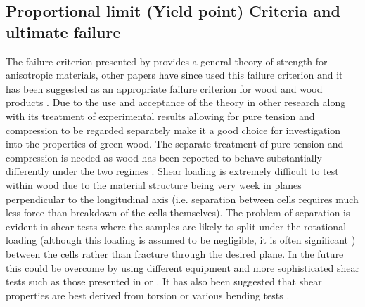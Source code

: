 \documentclass[10pt]{article}
\begin{document}
\subsection{Proportional limit (Yield point) Criteria and ultimate failure}
\label{sec:TW}
The failure criterion presented by \citet{tsai_general_1971} provides a general theory of strength for anisotropic materials, other papers have since used this failure criterion and it has been suggested as an appropriate failure criterion for wood and wood products \citep{mackenzie-helnwein_rate-independent_2005,mackenzie-helnwein_analysis_2005}.
Due to the use and acceptance of the theory in other research along with its treatment of experimental results allowing for pure tension and compression to be regarded separately make it a good choice for investigation into the properties of green wood. The separate treatment of pure tension and compression is needed as wood has been reported to behave substantially differently under the two regimes \citep{ozyhar_moisture-dependent_2013,bodig_jozsef_jayne_mechanics_1982}. Shear loading is extremely difficult to test within wood due to the material structure being very week in planes perpendicular to the longitudinal axis (i.e. separation between cells requires much less force than breakdown of the cells themselves). The problem of separation is evident in shear tests where the samples are likely to split under the rotational loading (although this loading is assumed to be negligible, it is often significant \citep{bodig_jozsef_jayne_mechanics_1982}) between the cells rather than fracture through the desired plane. In the future this could be overcome by using different equipment and more sophisticated shear tests such as those presented in \citep{bs_methods_1957} or  \citet{kollmann_f._cote_principles_1968}. It has also been suggested that shear properties are best derived from torsion or various bending tests \citep{moden_micromechanics_2008}.
\end{document}
